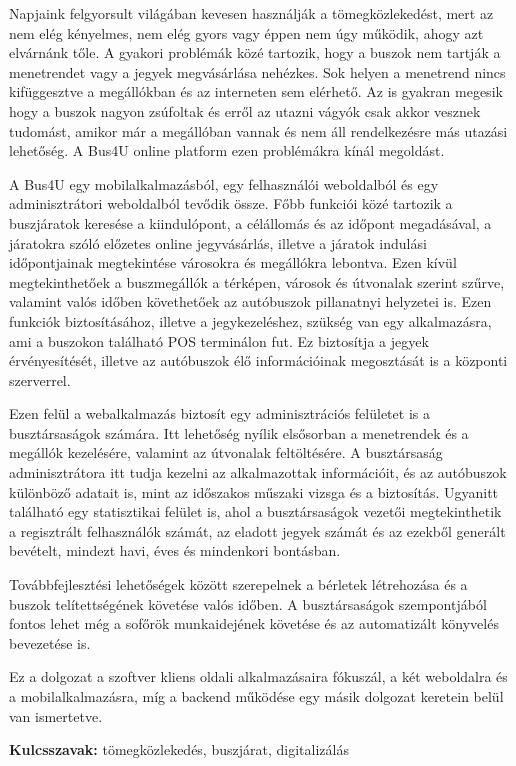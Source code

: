 Napjaink felgyorsult világában kevesen használják a tömegközlekedést, mert az nem elég kényelmes, nem elég gyors vagy éppen nem úgy működik, ahogy azt elvárnánk tőle. A gyakori problémák közé tartozik, hogy a buszok nem tartják a menetrendet vagy a jegyek megvásárlása nehézkes. Sok helyen a menetrend nincs kifüggesztve a megállókban és az interneten sem elérhető. Az is gyakran megesik hogy a buszok nagyon zsúfoltak és erről az utazni vágyók csak akkor vesznek tudomást, amikor már a megállóban vannak és nem áll rendelkezésre más utazási lehetőség. A Bus4U online platform ezen problémákra kínál megoldást.

A Bus4U egy mobilalkalmazásból, egy felhasználói weboldalból és egy adminisztrátori weboldalból tevődik össze. Főbb funkciói közé tartozik a buszjáratok keresése a kiindulópont, a célállomás és az időpont megadásával, a járatokra szóló előzetes online jegyvásárlás, illetve a járatok indulási időpontjainak megtekintése városokra és megállókra lebontva. Ezen kívül megtekinthetőek a buszmegállók a térképen, városok és útvonalak szerint szűrve, valamint valós időben követhetőek az autóbuszok pillanatnyi helyzetei is. Ezen funkciók biztosításához, illetve a jegykezeléshez, szükség van egy alkalmazásra, ami a buszokon található POS terminálon fut. Ez biztosítja a jegyek érvényesítését, illetve az autóbuszok élő információinak megosztását is a központi szerverrel.

Ezen felül a webalkalmazás biztosít egy adminisztrációs felületet is a busztársaságok számára. Itt lehetőség nyílik elsősorban a menetrendek és a megállók kezelésére, valamint az útvonalak feltöltésére. A busztársaság adminisztrátora itt tudja kezelni az alkalmazottak információit, és az autóbuszok különböző adatait is, mint az időszakos műszaki vizsga és a biztosítás. Ugyanitt található egy statisztikai felület is, ahol a busztársaságok vezetői megtekinthetik a regisztrált felhasználók számát, az eladott jegyek számát és az ezekből generált bevételt, mindezt havi, éves és mindenkori bontásban.

Továbbfejlesztési lehetőségek között szerepelnek a bérletek létrehozása és a buszok telítettségének követése valós időben. A busztársaságok szempontjából fontos lehet még a sofőrök munkaidejének követése és az automatizált könyvelés bevezetése is.

Ez a dolgozat a szoftver kliens oldali alkalmazásaira fókuszál, a két weboldalra és a mobilalkalmazásra, míg a backend működése egy másik dolgozat keretein belül van ismertetve.

\textbf{Kulcsszavak:} tömegközlekedés, buszjárat, digitalizálás